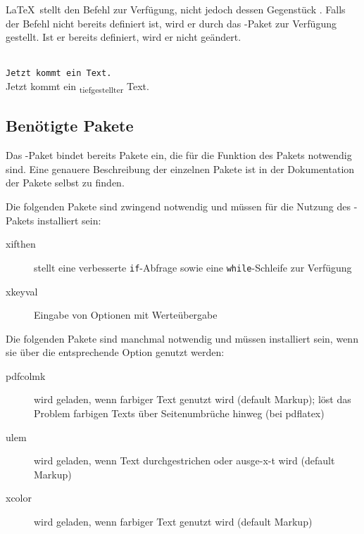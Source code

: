 \subsubsection{}
\DescribeMacro{\textsubscript}

\LaTeX\ stellt den Befehl  zur Verfügung, nicht jedoch dessen Gegenstück .
Falls der Befehl nicht bereits definiert ist, wird er durch das -Paket zur Verfügung gestellt.
Ist er bereits definiert, wird er nicht geändert.
\begin{chusage}
		\>\\
	\usageexample
		\>\texttt{Jetzt kommt ein  Text.}\\
		\>Jetzt kommt ein \textsubscript{tiefgestellter} Text.
\end{chusage}


\subsection{Benötigte Pakete}
\label{sec:user:packages}

Das -Paket bindet bereits Pakete ein, die für die Funktion des Pakets notwendig sind.
Eine genauere Beschreibung der einzelnen Pakete ist in der Dokumentation der Pakete selbst zu finden.

Die folgenden Pakete sind zwingend notwendig und müssen für die Nutzung des -Pakets installiert sein:
\begin{description}
	\item [xifthen] stellt eine verbesserte \texttt{if}-Abfrage sowie eine \texttt{while}-Schleife zur Verfügung
	\item [xkeyval] Eingabe von Optionen mit Werteübergabe
\end{description}

Die folgenden Pakete sind manchmal notwendig und müssen installiert sein, wenn sie über die entsprechende Option genutzt werden:
\begin{description}
	\item [pdfcolmk] wird geladen, wenn farbiger Text genutzt wird (default Markup); löst das Problem farbigen Texts über Seitenumbrüche hinweg (bei pdflatex)
	\item [ulem] wird geladen, wenn Text durchgestrichen oder ausge-x-t wird (default Markup)
	\item [xcolor] wird geladen, wenn farbiger Text genutzt wird (default Markup)
\end{description}



